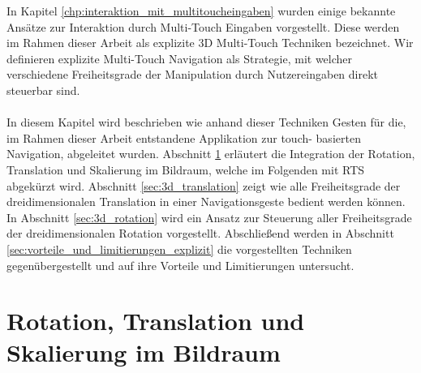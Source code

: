 In Kapitel \ref{chp:interaktion_mit_multitoucheingaben} wurden einige bekannte Ansätze zur Interaktion durch Multi-Touch Eingaben vorgestellt. Diese werden im Rahmen dieser Arbeit als explizite 3D Multi-Touch Techniken bezeichnet. Wir definieren explizite Multi-Touch Navigation als Strategie, mit welcher verschiedene Freiheitsgrade der Manipulation durch Nutzereingaben direkt steuerbar sind.
\\\\
In diesem Kapitel wird beschrieben wie anhand dieser Techniken Gesten für die, im Rahmen dieser  Arbeit entstandene Applikation zur touch- basierten Navigation, abgeleitet wurden. Abschnitt \ref{sec:rst_im_bildraum} erläutert die Integration der Rotation, Translation und Skalierung im Bildraum, welche im Folgenden mit RTS abgekürzt wird. Abschnitt \ref{sec:3d_translation} zeigt wie alle Freiheitsgrade der dreidimensionalen Translation in einer Navigationsgeste bedient werden können. In Abschnitt \ref{sec:3d_rotation} wird ein Ansatz zur Steuerung aller Freiheitsgrade der dreidimensionalen Rotation vorgestellt. Abschließend werden in Abschnitt \ref{sec:vorteile_und_limitierungen_explizit} die vorgestellten Techniken gegenübergestellt und auf ihre Vorteile und Limitierungen untersucht.


\section{Rotation, Translation und Skalierung im Bildraum}
\label{sec:rst_im_bildraum}

